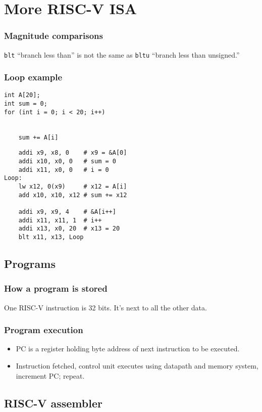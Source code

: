 \chapter{More RISC-V ISA}
\subsection{Magnitude comparisons}
\texttt{blt} ``branch less than'' is not the same as \texttt{bltu} ``branch less than unsigned.''

\subsection{Loop example}
\begin{multicols}{2}
	\begin{verbatim}
int A[20];
int sum = 0;
for (int i = 0; i < 20; i++)


	sum += A[i]
	\end{verbatim}
	\columnbreak
	\begin{verbatim}
	addi x9, x8, 0    # x9 = &A[0]
	addi x10, x0, 0   # sum = 0
	addi x11, x0, 0   # i = 0
Loop:
	lw x12, 0(x9)     # x12 = A[i]
	add x10, x10, x12 # sum += x12
	
	addi x9, x9, 4    # &A[i++]
	addi x11, x11, 1  # i++
	addi x13, x0, 20  # x13 = 20
	blt x11, x13, Loop
	\end{verbatim}
\end{multicols}

\section{Programs}
\subsection{How a program is stored}
One RISC-V instruction is 32 bits. It's next to all the other data.
\subsection{Program execution}
\begin{itemize}
	\item PC is a register holding byte address of next instruction to be executed.
	\item Instruction fetched, control unit executes using datapath and memory system, increment PC; repeat.
\end{itemize}

\section{RISC-V assembler}
